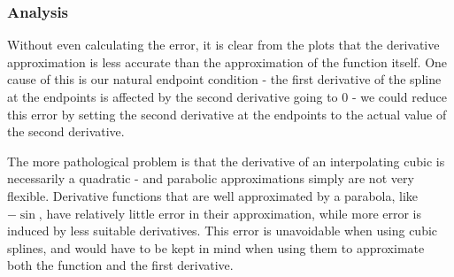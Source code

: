 \documentclass[11pt]{article} %
\begin{document}
\subsubsection*{Analysis}
Without even calculating the error, it is clear from the plots that the derivative approximation is less accurate than
the approximation of the function itself. One cause of this is our natural endpoint condition - the first derivative of the spline
at the endpoints is affected by the second derivative going to $0$ - we could reduce this error by setting the second derivative
at the endpoints to the actual value of the second derivative.
\par The more pathological problem is that the derivative of an interpolating cubic is necessarily a quadratic - and parabolic approximations simply are not very flexible. Derivative functions that are well approximated by a parabola, like $-\sin$, have relatively little error in their approximation, while more error is induced by less suitable derivatives. This error is unavoidable when using cubic splines, and would have to be kept in mind when using them to approximate both the function and the first derivative.
\end{document}
